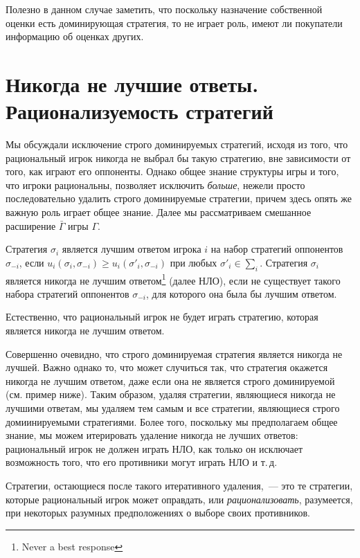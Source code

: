 Полезно в данном случае заметить, что поскольку назначение
собственной оценки есть доминирующая стратегия, то не играет роль,
имеют ли покупатели информацию об оценках других.


\section{Никогда не лучшие ответы. Рационализуемость стратегий}

Мы обсуждали исключение строго доминируемых стратегий, исходя из
того, что рациональный игрок никогда не выбрал бы такую стратегию,
вне зависимости от того, как играют его оппоненты. Однако общее
знание структуры игры и того, что игроки рациональны, позволяет
исключить {\it больше}, нежели просто последовательно удалить строго
доминируемые стратегии, причем здесь опять же важную роль играет
общее знание.  Далее мы рассматриваем смешанное расширение
$\bar\Gamma$ игры $\Gamma$.

\begin{definition}
Стратегия $\sigma_i$ является лучшим ответом игрока $i$ на набор
стратегий оппонентов $\sigma_{-i}$, если
$u_i(\sigma_i,\sigma_{-i})\ge u_i(\sigma'_i,\sigma_{-i})$ при любых
$\sigma'_i\in\sum_i$. Стратегия $\sigma_i$ является никогда не
лучшим ответом\footnote{ Never a best response} (далее НЛО), если не
существует такого набора стратегий оппонентов  $\sigma_{-i}$, для
которого она была бы лучшим ответом.
\end{definition}

Естественно, что рациональный игрок не будет играть стратегию,
которая является никогда не лучшим ответом.

Совершенно очевидно, что строго доминируемая стратегия является
никогда не лучшей. Важно однако то, что может случиться так, что
стратегия окажется никогда не лучшим ответом, даже если она не
является строго доминируемой (см. пример ниже). Таким образом,
удаляя стратегии, являющиеся никогда не лучшими ответам, мы удаляем
тем самым и все стратегии, являющиеся строго домиинируемыми
стратегиями. Более того, поскольку мы предполагаем общее знание, мы
можем итерировать удаление никогда не лучших ответов: рациональный
игрок не должен играть НЛО, как только он исключает возможность
того, что его противники могут играть НЛО и т.\,д.

Стратегии, остающиеся после такого итеративного удаления,~--- это те
стратегии, которые рациональный игрок может оправдать, или {\it
рационализовать}, разумеется, при некоторых разумных предположениях
о выборе своих противников.

